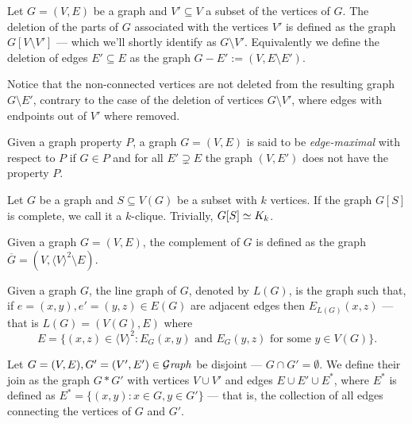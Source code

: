 \begin{definition}
  \label{def: deletion-graph}
  Let \(G = (V, E)\) be a graph and \(V' \subseteq V\) a subset of the
  vertices of \(G\). The deletion of the parts of \(G\) associated with the
  vertices \(V'\) is defined as the graph \(G[V \setminus V']\) --- which we'll
  shortly identify as \(G \setminus V'\). Equivalently we define the deletion
  of edges \(E' \subseteq E\) as the graph \(G - E' := (V, E \setminus E')\).
\end{definition}

Notice that the non-connected vertices are not deleted from the resulting graph
\(G \setminus E'\), contrary to the case of the deletion of vertices \(G
\setminus V'\), where edges with endpoints out of \(V'\) where removed.

\begin{definition}
  \label{def: edge-maximal}
  Given a graph property \(P\), a graph \(G = (V, E)\) is said to be
  \emph{edge-maximal} with respect to \(P\) if \(G \in P\) and for all \(E'
  \supsetneq E\) the graph \((V, E')\) does not have the property \(P\).
\end{definition}

\begin{definition}[Clique]\label{def: clique}
  Let \(G\) be a graph and \(S \subseteq V(G)\) be a subset with \(k\) vertices.
  If the graph \(G[S]\) is complete, we call it a \(k\)-clique. Trivially,
  \(G[S] \simeq K_k\).
\end{definition}

\begin{definition}\label{def: complement-graph}
  Given a graph \(G = (V, E)\), the complement of \(G\) is defined as the graph
  \(\overline G = (V, \langle V \rangle^2 \setminus E)\).
\end{definition}

\begin{definition}\label{def: line-graph}
  Given a graph \(G\), the line graph of \(G\), denoted by \(L(G)\), is the
  graph such that, if \(e = (x, y), e' = (y, z) \in E(G)\) are adjacent edges
  then \(E_{L(G)}(x, z)\) --- that is \(L(G) = (V(G), E)\) where
  \[
    E = \{(x, z) \in \langle V \rangle^2 : E_G(x, y) \text{ and } E_G(y, z)
    \text{ for some } y \in V(G)\}.
  \]
\end{definition}

\begin{definition}[Join]\label{def: graph-join}
  Let \(G = (V, E), G' = (V', E') \in {\mathcal{G}\textit{raph}}\) be disjoint --- \(G \cap G' =
  \emptyset\). We define their join as the graph \(G * G'\) with vertices \(V
  \cup V'\) and edges \(E \cup E' \cup E^*\), where \(E^*\) is defined as \(E^*
  = \{(x, y) : x \in G, y \in G'\}\) --- that is, the collection of all edges
  connecting the vertices of \(G\) and \(G'\).
\end{definition}


